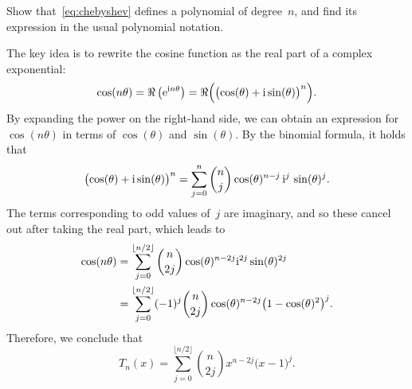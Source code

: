 \begin{exercise}
    \label{exercise:chebychev}
    Show that~\eqref{eq:chebyshev} defines a polynomial of degree~$n$,
    and find its expression in the usual polynomial notation.
\end{exercise}
\begin{solution}
    The key idea is to rewrite the cosine function as the real part of a complex exponential:
    \[
        \cos (n \theta) = \Re \left( \mathrm e^{\mathrm i n \theta} \right)
            = \Re \Bigl( \bigl( \cos (\theta) + \mathrm i \sin (\theta) \bigr)^n \Bigr).
    \]
    By expanding the power on the right-hand side,
    we can obtain an expression for $\cos(n \theta)$ in terms of $\cos(\theta)$ and $\sin(\theta)$.
    By the binomial formula,
    it holds that
    \[
        \bigl( \cos (\theta) + \mathrm i \sin (\theta) \bigr)^n
        = \sum_{j=0}^{n} \binom{n}{j} \cos(\theta)^{n-j}  \, \mathrm i^{j} \, \sin(\theta)^{j}.
    \]
    The terms corresponding to odd values of~$j$ are imaginary,
    and so these cancel out after taking the real part,
    which leads to
    \begin{align*}
        \cos (n \theta)
        &= \sum_{j=0}^{\lfloor n/2 \rfloor} \binom{n}{2j} \cos(\theta)^{n-2j}  \mathrm i^{2j} \sin(\theta)^{2j} \\
        &= \sum_{j=0}^{\lfloor n/2 \rfloor} (-1)^j \binom{n}{2j} \cos(\theta)^{n-2j}   \bigl(1 - \cos(\theta)^2\bigr)^j.
    \end{align*}
    Therefore,
    we conclude that
    \begin{equation}
        \label{eq:expression_chebyshev}
        T_n(x) = \sum_{j=0}^{\lfloor n/2 \rfloor} \binom{n}{2j} x^{n-2j}   \bigl(x - 1\bigr)^j.
    \end{equation}
\end{solution}

